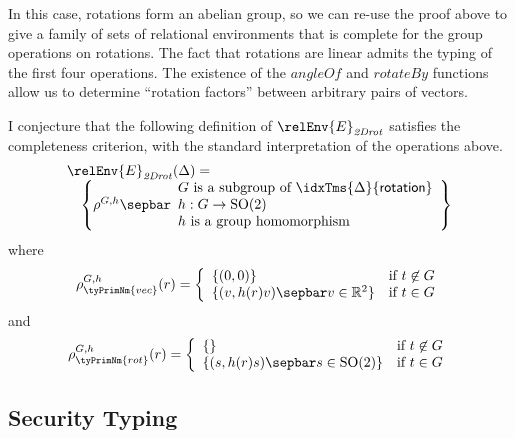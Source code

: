 \begin{enumerate}
  In this case, rotations form an abelian group, so we can re-use the
  proof above to give a family of sets of relational environments that
  is complete for the group operations on rotations. The fact that
  rotations are linear admits the typing of the first four
  operations. The existence of the $\mathit{angleOf}$ and
  $\mathit{rotateBy}$ functions allow us to determine ``rotation
  factors'' between arbitrary pairs of vectors.

  I conjecture that the following definition of
  $\relEnv{E}_{\mathit{2Drot}}$ satisfies the completeness criterion,
  with the standard interpretation of the operations above.
  \begin{displaymath}
    \begin{array}{l}
      \relEnv{E}_{\mathit{2Drot}}(\Delta) = \\
      \quad\left\{ \rho^{G,h} \sepbar
        \begin{array}{l}
          G\textrm{ is a subgroup of }\idxTms{\Delta}{\mathsf{rotation}} \\
          h : G \to \mathrm{SO}(2) \\
          h\textrm{ is a group homomorphism}
        \end{array}
      \right\}
    \end{array}
  \end{displaymath}
  where
  \begin{displaymath}
    \rho^{G,h}_{\tyPrimNm{vec}}(r) = \left\{
      \begin{array}{ll}
        \{(0,0)\} & \textrm{if }t \not\in G \\
        \{(v,h(r) v) \sepbar v \in \mathbb{R}^2 \} & \textrm{if }t \in G
      \end{array}
    \right.
  \end{displaymath}
  and
  \begin{displaymath}
    \rho^{G,h}_{\tyPrimNm{rot}}(r) = \left\{
      \begin{array}{ll}
        \{\} & \textrm{if }t \not\in G \\
        \{(s,h(r) s) \sepbar s \in \mathrm{SO}(2) \} & \textrm{if }t \in G
      \end{array}
    \right.
  \end{displaymath}
\end{enumerate}

\subsection{Security Typing}\label{sec:sec-semantics}

